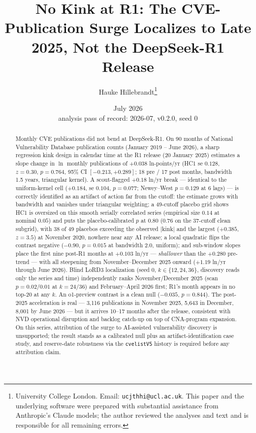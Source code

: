 \documentclass[11pt]{article}
\title{No Kink at R1: The CVE-Publication Surge Localizes to Late 2025,
Not the DeepSeek-R1 Release}
\author{Hauke Hillebrandt\thanks{University College London. Email:
\texttt{ucjthhi@ucl.ac.uk}. This paper and the underlying \natex{} software were
prepared with substantial assistance from Anthropic's Claude models; the author
reviewed the analyses and text and is responsible for all remaining errors.}}
\date{July 2026 \\ \small analysis pass of record: 2026-07, \natex{} v0.2.0, seed 0}
\begin{document}
\maketitle

\begin{abstract}
\noindent Monthly CVE publications did not bend at DeepSeek-R1. On 90 months
of National Vulnerability Database publication counts (January 2019 -- June
2026), a sharp regression kink design in calendar time at the R1 release (20
January 2025) estimates a slope change in $\ln$ monthly publications of
$+0.038$ ln-points/yr (HC1 se $0.128$, $z=0.30$, $p=0.764$, 95\% CI
$[-0.213, +0.289]$; 18 pre / 17 post months, bandwidth 1.5 years, triangular
kernel). A scout-flagged $+0.18$ ln/yr break --- identical to the
uniform-kernel cell ($+0.184$, se $0.104$, $p=0.077$; Newey--West $p=0.129$
at 6 lags) --- is correctly identified as an artifact of action far from the
cutoff: the estimate grows with bandwidth and vanishes under triangular
weighting; a 49-cutoff placebo grid shows HC1 is oversized on this smooth
serially correlated series (empirical size $0.14$ at nominal $0.05$) and puts
the placebo-calibrated $p$ at $0.80$ ($0.76$ on the 37-cutoff clean subgrid),
with 38 of 49 placebos exceeding the observed $|$kink$|$ and the largest
($+0.385$, $z=3.5$) at November 2020, nowhere near any AI release; a local
quadratic flips the contrast negative ($-0.90$, $p=0.015$ at bandwidth 2.0,
uniform); and sub-window slopes place the first nine post-R1 months at
$+0.103$ ln/yr --- \emph{shallower} than the $+0.280$ pre-trend --- with all
steepening from November--December 2025 onward ($+1.19$ ln/yr through June
2026). Blind LoRD3 localization (seed 0, $k\in\{12,24,36\}$, discovery reads
only the series and time) independently ranks November/December 2025 (scan
$p=0.02$/$0.01$ at $k=24$/$36$) and February--April 2026 first; R1's month
appears in no top-20 at any $k$. An o1-preview contrast is a clean null
($-0.035$, $p=0.844$). The post-2025 acceleration is real --- 3{,}116
publications in November 2025, 5{,}643 in December, 8{,}001 by June 2026 ---
but it arrives 10--17 months after the release, consistent with NVD
operational disruption and backlog catch-up on top of CNA-program expansion.
On this series, attribution of the surge to AI-assisted vulnerability
discovery is unsupported; the result stands as a calibrated null plus an
artifact-identification case study, and reserve-date robustness via the
\texttt{cvelistV5} history is required before any attribution claim.
\end{abstract}
\end{document}

